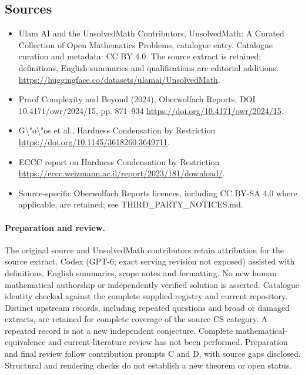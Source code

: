 \documentclass[11pt]{article}
\begin{document}
\subsection{Sources}
\begin{itemize}
\item[\hypertarget{source:statement:1}{S1}] Ulam AI and the UnsolvedMath Contributors, UnsolvedMath: A Curated Collection of Open Mathematics Problems, catalogue entry. Catalogue curation and metadata: CC BY 4.0. The source extract is retained; definitions, English summaries and qualifications are editorial additions.
\url{https://huggingface.co/datasets/ulamai/UnsolvedMath}.
\item[\hypertarget{source:statement:2}{S2}] Proof Complexity and Beyond (2024), Oberwolfach Reports, DOI 10.4171/owr/2024/15, pp. 871--934
\url{https://doi.org/10.4171/owr/2024/15}.
\item[\hypertarget{source:statement:3}{S3}] G\textbackslash{}"o\textbackslash{}"os et al., Hardness Condensation by Restriction
\url{https://doi.org/10.1145/3618260.3649711}.
\item[\hypertarget{source:statement:4}{S4}] ECCC report on Hardness Condensation by Restriction
\url{https://eccc.weizmann.ac.il/report/2023/181/download/}.
\item Source-specific Oberwolfach Reports licences, including CC BY-SA 4.0 where applicable, are retained; see THIRD\_PARTY\_NOTICES.md.
\end{itemize}
\paragraph{Preparation and review.}
The original source and UnsolvedMath contributors retain attribution for the source extract. Codex (GPT-6; exact serving revision not exposed) assisted with definitions, English summaries, scope notes and formatting. No new human mathematical authorship or independently verified solution is asserted. Catalogue identity checked against the complete supplied registry and current repository. Distinct upstream records, including repeated questions and broad or damaged extracts, are retained for complete coverage of the source CS category. A repeated record is not a new independent conjecture. Complete mathematical-equivalence and current-literature review has not been performed. Preparation and final review follow contribution prompts C and D, with source gaps disclosed. Structural and rendering checks do not establish a new theorem or open status.
\label{end:statement}
\end{document}
